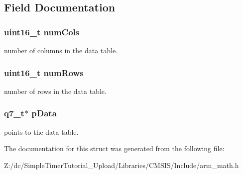 \subsection{Field Documentation}
\hypertarget{structarm__bilinear__interp__instance__q7_a4bb5ec0d13eb4c9cf887aa8366a44117}{
\subsubsection[{num\-Cols}]{\setlength{\rightskip}{0pt plus 5cm}uint16\-\_\-t num\-Cols}}\label{structarm__bilinear__interp__instance__q7_a4bb5ec0d13eb4c9cf887aa8366a44117}
number of columns in the data table. \hypertarget{structarm__bilinear__interp__instance__q7_a1bcf80ccdc2acc29198f1592ae300390}{
\subsubsection[{num\-Rows}]{\setlength{\rightskip}{0pt plus 5cm}uint16\-\_\-t num\-Rows}}\label{structarm__bilinear__interp__instance__q7_a1bcf80ccdc2acc29198f1592ae300390}
number of rows in the data table. \hypertarget{structarm__bilinear__interp__instance__q7_afde7546ea2ec5df9fe42fb04d128a016}{
\subsubsection[{p\-Data}]{\setlength{\rightskip}{0pt plus 5cm}q7\-\_\-t$\ast$ p\-Data}}\label{structarm__bilinear__interp__instance__q7_afde7546ea2ec5df9fe42fb04d128a016}
points to the data table. 

The documentation for this struct was generated from the following file\-:\begin{DoxyCompactItemize}
\item 
Z\-:/dc/\-Simple\-Timer\-Tutorial\-\_\-\-Upload/\-Libraries/\-C\-M\-S\-I\-S/\-Include/arm\-\_\-math.\-h\end{DoxyCompactItemize}
